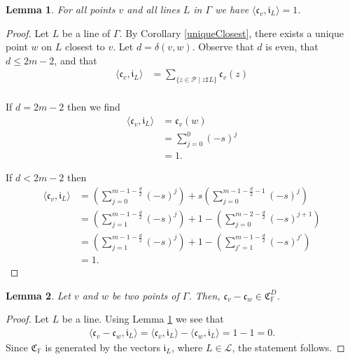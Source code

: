 \documentclass[12pt]{article}
\newcommand{\F}{\mathbb{F}}
\newcommand{\Points}{\mathcal{P}}
\newcommand{\Lines}{\mathcal{L}}
\newcommand{\I}{\mathtt{I}}
\renewcommand{\c}{\mathfrak{c}}
\newcommand{\cv}{\mathfrak{c}_{v}}
\newtheorem{lemma}{Lemma}
\theoremstyle{remark}
\begin{document}
\begin{lemma}\label{cx1} For all points $v$ and all lines $L$ in $\Gamma$ we have
    \(\langle\cv, \mathfrak{i}_L\rangle = 1\).
\end{lemma}
\begin{proof}
	Let \(L\) be a line of \(\Gamma\). By Corollary \ref{uniqueClosest}, there exists a unique point \(w\) on \(L\) closest to \(v\). 
	Let \(d = \delta(v,w)\). Observe that $d$ is even, that \(d \le 2m-2\), and that 
	\begin{align*}
		\langle\cv, \mathfrak{i}_L\rangle 
		&= \sum_{\{z\in\Points\mid z\I L\}} \cv(z)\\
	\end{align*}

	If \(d = 2m-2\) then we find
	\begin{align*}
		\langle\cv, \mathfrak{i}_L\rangle 
		&= \cv(w) \\
		&= \sum_{j=0}^{0} (-s)^{j} \\
		&= 1.
	\end{align*}
	
	If \(d<2m-2\) then
	\begin{align*}
		\langle\cv, \mathfrak{i}_L\rangle 
		&= \left(\sum_{j=0}^{m-1-\frac{d}{2}} (-s)^{j}\right) + s\left(\sum_{j=0}^{m-1-\frac{d}{2}-1} (-s)^{j}\right) \\
		&= \left(\sum_{j=1}^{m-1-\frac{d}{2}} (-s)^{j}\right) + 1 - \left(\sum_{j=0}^{m-2-\frac{d}{2}} (-s)^{j+1}\right) \\
		&= \left(\sum_{j=1}^{m-1-\frac{d}{2}} (-s)^{j}\right) + 1 - \left(\sum_{j'=1}^{m-1-\frac{d}{2}} (-s)^{j'}\right) \\
		&= 1.
	\end{align*}
\end{proof}

\begin{lemma}\label{cxcy}
	Let \(v\) and \(w\) be two points of \(\Gamma\). 
	Then, \(\cv-\c_w \in \mathfrak{C}_{\mathbb{F}}^D\). 
\end{lemma}
\begin{proof} Let $L$ be a line.	Using Lemma \ref{cx1} we see that
	\begin{align*}
		\langle\cv-\c_w, \mathfrak{i}_L\rangle  =  \langle\cv, \mathfrak{i}_L\rangle - \langle\c_w, \mathfrak{i}_L\rangle = 1 - 1 = 0.     
	\end{align*}
    Since $\mathfrak{C}_\F$ is generated by the vectors $\mathfrak{i}_L$, where $L\in \mathcal{L}$, the statement follows.
\end{proof}
\end{document}
